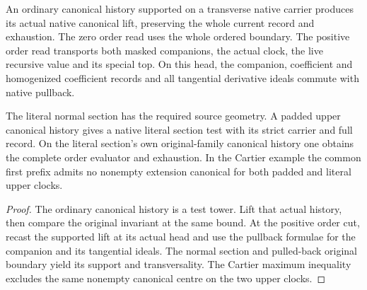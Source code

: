 \begin{theorem}
\label{hir:g1-ordinary-literal-section-evaluator}
\leanok
An ordinary canonical history supported on a transverse native
carrier produces its actual native canonical lift, preserving
the whole current record and exhaustion. The zero order read
uses the whole ordered boundary. The positive order read
transports both masked companions, the actual clock, the live
recursive value and its special top. On this head, the companion,
coefficient and homogenized coefficient records and all
tangential derivative ideals commute with native pullback.

The literal normal section has the required source geometry.
A padded upper canonical history gives a native literal section
test with its strict carrier and full record. On the literal
section's own original-family canonical history one obtains
the complete order evaluator and exhaustion. In the Cartier
example the common first prefix admits no nonempty extension
canonical for both padded and literal upper clocks.
\end{theorem}
\begin{proof}
The ordinary canonical history is a test tower. Lift that
actual history, then compare the original invariant at the
same bound. At the positive order cut, recast the supported
lift at its actual head and use the pullback formulae for the
companion and its tangential ideals. The normal section and
pulled-back original boundary yield its support and
transversality. The Cartier maximum inequality excludes the
same nonempty canonical centre on the two upper clocks.
\end{proof}

